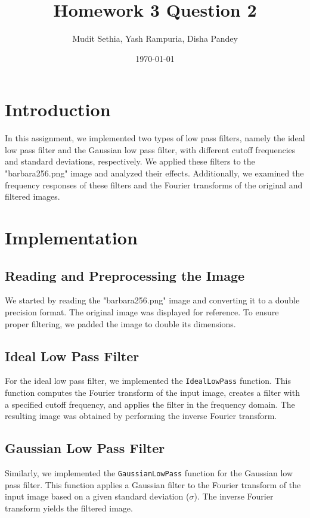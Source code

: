\documentclass{article}
\title{Homework 3 Question 2}
\author{Mudit Sethia, Yash Rampuria, Disha Pandey}
\date{\today}
\begin{document}
\maketitle

\section{Introduction}
In this assignment, we implemented two types of low pass filters, namely the ideal low pass filter and the Gaussian low pass filter, with different cutoff frequencies and standard deviations, respectively. We applied these filters to the "barbara256.png" image and analyzed their effects. Additionally, we examined the frequency responses of these filters and the Fourier transforms of the original and filtered images.

\section{Implementation}

\subsection{Reading and Preprocessing the Image}
We started by reading the "barbara256.png" image and converting it to a double precision format. The original image was displayed for reference. To ensure proper filtering, we padded the image to double its dimensions.

\subsection{Ideal Low Pass Filter}
For the ideal low pass filter, we implemented the \texttt{IdealLowPass} function. This function computes the Fourier transform of the input image, creates a filter with a specified cutoff frequency, and applies the filter in the frequency domain. The resulting image was obtained by performing the inverse Fourier transform.

\subsection{Gaussian Low Pass Filter}
Similarly, we implemented the \texttt{GaussianLowPass} function for the Gaussian low pass filter. This function applies a Gaussian filter to the Fourier transform of the input image based on a given standard deviation (\(\sigma\)). The inverse Fourier transform yields the filtered image.
\end{document}
